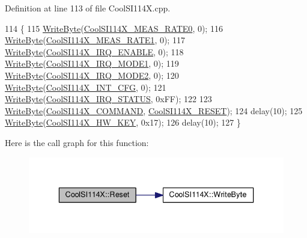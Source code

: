 Definition at line 113 of file Cool\+S\+I114\+X.\+cpp.


\begin{DoxyCode}
114 \{
115   \hyperlink{class_cool_s_i114_x_ac5c8dc5ade604da7a1c8cd1586feefc2}{WriteByte}(\hyperlink{_cool_s_i114_x_8h_ac973af926c6e96ed2952ddfe6ae5d774}{CoolSI114X\_MEAS\_RATE0}, 0);
116   \hyperlink{class_cool_s_i114_x_ac5c8dc5ade604da7a1c8cd1586feefc2}{WriteByte}(\hyperlink{_cool_s_i114_x_8h_ade88d1de944c144357f43a4839601f99}{CoolSI114X\_MEAS\_RATE1}, 0);
117   \hyperlink{class_cool_s_i114_x_ac5c8dc5ade604da7a1c8cd1586feefc2}{WriteByte}(\hyperlink{_cool_s_i114_x_8h_a286ba10e3d74c8f266cd328de58d4290}{CoolSI114X\_IRQ\_ENABLE}, 0);
118   \hyperlink{class_cool_s_i114_x_ac5c8dc5ade604da7a1c8cd1586feefc2}{WriteByte}(\hyperlink{_cool_s_i114_x_8h_afd988636f020c93894fd88f4c29ca7a2}{CoolSI114X\_IRQ\_MODE1}, 0);
119   \hyperlink{class_cool_s_i114_x_ac5c8dc5ade604da7a1c8cd1586feefc2}{WriteByte}(\hyperlink{_cool_s_i114_x_8h_a032a469f9ee04fa98d5fa02f9c55bc71}{CoolSI114X\_IRQ\_MODE2}, 0);
120   \hyperlink{class_cool_s_i114_x_ac5c8dc5ade604da7a1c8cd1586feefc2}{WriteByte}(\hyperlink{_cool_s_i114_x_8h_aba29521df18b7e2a307f5fbcdc37f2c8}{CoolSI114X\_INT\_CFG}, 0);
121   \hyperlink{class_cool_s_i114_x_ac5c8dc5ade604da7a1c8cd1586feefc2}{WriteByte}(\hyperlink{_cool_s_i114_x_8h_abba32ef36c55e865c33cc64d3bad572d}{CoolSI114X\_IRQ\_STATUS}, 0xFF);
122 
123   \hyperlink{class_cool_s_i114_x_ac5c8dc5ade604da7a1c8cd1586feefc2}{WriteByte}(\hyperlink{_cool_s_i114_x_8h_af443805ce1c198eff43fb1b840c45500}{CoolSI114X\_COMMAND}, \hyperlink{_cool_s_i114_x_8h_a4bb90529203a09df046bdb2d983263c4}{CoolSI114X\_RESET});
124   delay(10);
125   \hyperlink{class_cool_s_i114_x_ac5c8dc5ade604da7a1c8cd1586feefc2}{WriteByte}(\hyperlink{_cool_s_i114_x_8h_ac5005d0d199fbb194913a43e791defa0}{CoolSI114X\_HW\_KEY}, 0x17);
126   delay(10);
127 \}
\end{DoxyCode}
Here is the call graph for this function\+:\nopagebreak
\begin{figure}[H]
\begin{center}
\leavevmode
\includegraphics[width=336pt]{dd/d67/class_cool_s_i114_x_a9d9f9c9129c0c29ed497f8563f3dd823_cgraph}
\end{center}
\end{figure}
